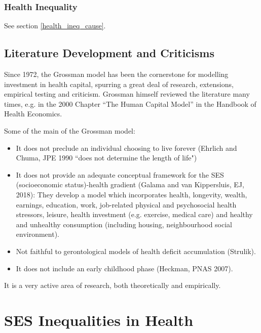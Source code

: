         \subsubsection{Health Inequality}

            See section \ref{health_ineq_cause}.

    \subsection{Literature Development and Criticisms}
    
        Since 1972, the Grossman model has been the cornerstone for modelling investment in health capital, spurring a great deal of research, extensions, empirical testing and criticism. Grossman himself reviewed the literature many times, e.g. in the 2000 Chapter “The Human Capital Model” in the Handbook of Health Economics.
        
        Some of the main  of the Grossman model:
            \begin{itemize}
                \item It does not preclude an individual choosing to live forever (Ehrlich and Chuma, JPE 1990 “does not determine the length of life")
                \item It does not provide an adequate conceptual framework for the SES (socioeconomic status)-health gradient (Galama and van Kippersluis, EJ, 2018): They develop a model which incorporates health, longevity, wealth, earnings, education, work, job-related physical and psychosocial health stressors, leisure, health investment (e.g. exercise, medical care) and healthy and unhealthy consumption (including housing, neighbourhood social environment).
                \item Not faithful to gerontological models of health deficit accumulation (Strulik).
                \item It does not include an early childhood phase (Heckman, PNAS 2007).
            \end{itemize}
            
        It is a very active area of research, both theoretically and empirically.




\section{ SES Inequalities in Health}\

